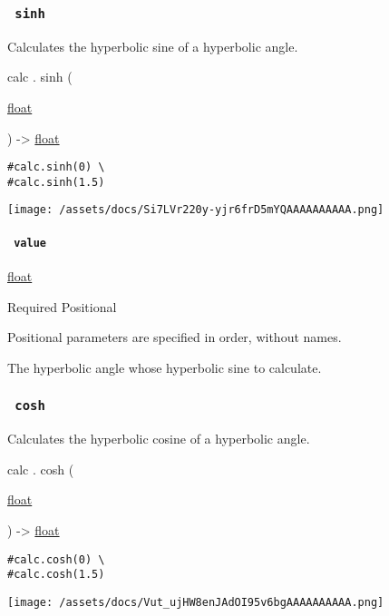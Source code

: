 \subsubsection{\texorpdfstring{\texttt{\ sinh\ }}{ sinh }}\label{functions-sinh}

Calculates the hyperbolic sine of a hyperbolic angle.

calc { . } { sinh } (

{ \href{/docs/reference/foundations/float/}{float} }

) -\textgreater{} \href{/docs/reference/foundations/float/}{float}

\begin{verbatim}
#calc.sinh(0) \
#calc.sinh(1.5)
\end{verbatim}

\texttt{[image: /assets/docs/Si7LVr220y-yjr6frD5mYQAAAAAAAAAA.png]}

\paragraph{\texorpdfstring{\texttt{\ value\ }}{ value }}\label{functions-sinh-value}

\href{/docs/reference/foundations/float/}{float}

{Required} {{ Positional }}

\label{functions-sinh-value-positional-tooltip}
Positional parameters are specified in order, without names.

The hyperbolic angle whose hyperbolic sine to calculate.

\subsubsection{\texorpdfstring{\texttt{\ cosh\ }}{ cosh }}\label{functions-cosh}

Calculates the hyperbolic cosine of a hyperbolic angle.

calc { . } { cosh } (

{ \href{/docs/reference/foundations/float/}{float} }

) -\textgreater{} \href{/docs/reference/foundations/float/}{float}

\begin{verbatim}
#calc.cosh(0) \
#calc.cosh(1.5)
\end{verbatim}

\texttt{[image: /assets/docs/Vut\_ujHW8enJAdOI95v6bgAAAAAAAAAA.png]}

